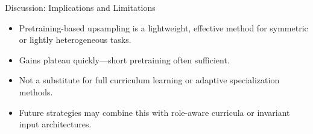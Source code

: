 \begin{frame}{Discussion: Implications and Limitations}
    \begin{itemize}
        \item Pretraining-based upsampling is a lightweight, effective method for symmetric or lightly heterogeneous tasks.
        \item Gains plateau quickly—short pretraining often sufficient.
        \item Not a substitute for full curriculum learning or adaptive specialization methods.
        \item Future strategies may combine this with role-aware curricula or invariant input architectures.
    \end{itemize}
\end{frame}
